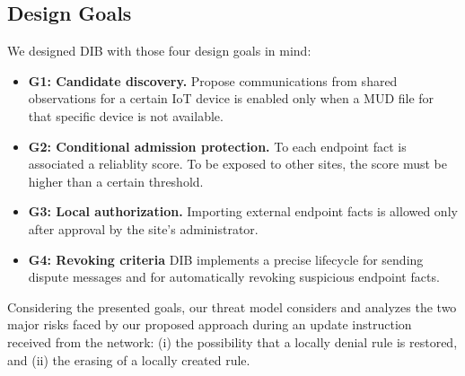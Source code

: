 \documentclass[journal]{IEEEtran}
\theoremstyle{definition}
\begin{document}
\subsection{Design Goals}
We designed DIB with those four design goals in mind:
\begin{itemize}
    \item \textbf{G1: Candidate discovery.} Propose communications from shared observations for a certain IoT device is enabled only when a MUD file for that specific device is not available.
    \item \textbf{G2: Conditional admission protection.} To each endpoint fact is associated a reliablity score. To be exposed to other sites, the score must be higher than a certain threshold.
    \item \textbf{G3: Local authorization.} Importing external endpoint facts is allowed only after approval by the site's administrator.
  \item \textbf{G4: Revoking criteria} %
  DIB implements a precise lifecycle for sending dispute messages and for automatically revoking suspicious endpoint facts.
\end{itemize}

Considering the presented goals, our threat model considers and analyzes the two major risks faced by our proposed approach during an update instruction received from the network: (i) the possibility that a locally denial rule is restored, and (ii) the erasing of a locally created rule.

\end{document}
